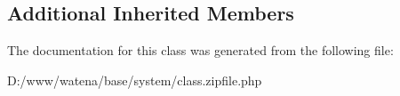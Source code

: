 \subsection*{Additional Inherited Members}


The documentation for this class was generated from the following file\-:\begin{DoxyCompactItemize}
\item 
D\-:/www/watena/base/system/class.\-zipfile.\-php\end{DoxyCompactItemize}
